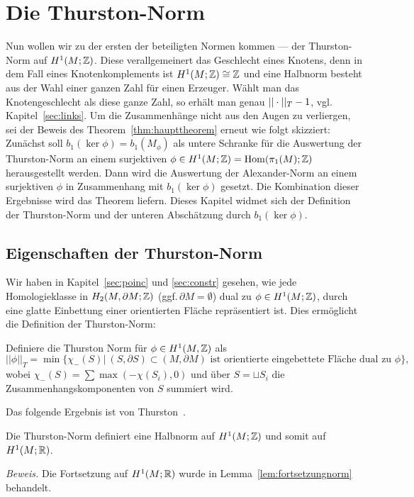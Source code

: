 
\section{Die Thurston-Norm}
	
	Nun wollen wir zu der ersten der beteiligten Normen kommen --- der Thurston-Norm auf $H^1(M;\mathbb{Z})$. Diese verallgemeinert das Geschlecht eines Knotens, denn in dem Fall eines Knotenkomplements ist $H^1(M;\mathbb{Z})\cong \mathbb{Z}$ und eine Halbnorm besteht aus der Wahl einer ganzen Zahl für einen Erzeuger. Wählt man das Knotengeschlecht als diese ganze Zahl, so erhält man genau $||\cdot||_T -1$, vgl.\,Kapitel~\ref{sec:links}. Um die Zusammenhänge nicht aus den Augen zu verliergen, sei der Beweis des Theorem~\ref{thm:haupttheorem} erneut wie folgt skizziert: Zunächst soll $b_1(\ker\phi)=b_1(M_\phi)$ als untere Schranke für die Auswertung der Thurston-Norm an einem surjektiven $\phi \in H^1(M;\mathbb{Z}) = \operatorname{Hom} (\pi_1(M);\mathbb{Z})$ herausgestellt werden. Dann wird die Auswertung der Alexander-Norm an einem surjektiven $\phi$ in Zusammenhang mit $b_1(\ker\phi)$ gesetzt. Die Kombination dieser Ergebnisse wird das Theorem liefern. Dieses Kapitel widmet sich der Definition der Thurston-Norm und der unteren Abschätzung durch $b_1(\ker\phi)$.

	\subsection{Eigenschaften der Thurston-Norm}
		\label{sec:thurstondef}
        Wir haben in Kapitel~\ref{sec:poinc} und \ref{sec:constr} gesehen, wie jede Homologieklasse in $H_2(M,\partial M;\mathbb{Z})$ (ggf.\,$\partial M=\emptyset$) dual zu $\phi \in H^1(M;\mathbb{Z})$, durch eine glatte Einbettung einer orientierten Fläche repräsentiert ist. Dies  ermöglicht die Definition der Thurston-Norm:
        \begin{defn}
        	Definiere die Thurston Norm für $\phi \in H^1(M,\mathbb{Z})$ als
        	\[
        	        		||\phi||_T = \min\{ \chi_-(S)| ~(S,\partial S) \subset (M,\partial M)\text{ ist orientierte eingebettete Fläche dual zu } \phi \},
        	        	\]        	
        	wobei $\chi_-(S)=\sum \max (-\chi(S_i),0)$ und über $S=\sqcup S_i$ die Zusammenhangskomponenten von $S$ summiert wird.
        \end{defn}
        
        Das folgende Ergebnis ist von Thurston~\cite{Thurston.1986}.
        \begin{lem}
        \label{lem:norm}
        	Die Thurston-Norm definiert eine Halbnorm auf $H^1(M;\mathbb{Z})$ und somit auf $H^1(M;\mathbb{R})$. 
        \end{lem}
          \noindent\textit{Beweis.}
          Die Fortsetzung auf $H^1(M;\mathbb{R})$ wurde in Lemma~\ref{lem:fortsetzungnorm} behandelt.

